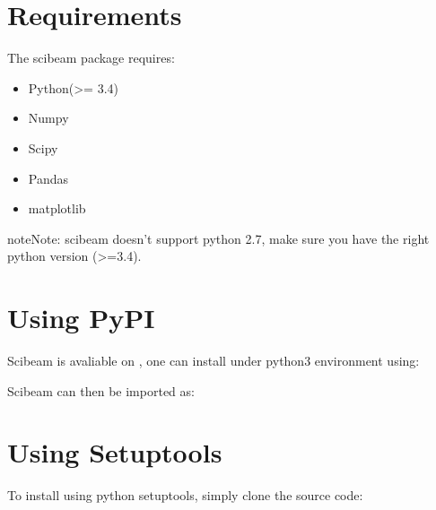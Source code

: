 \documentclass[letterpaper,10pt,english]{sphinxmanual}
\begin{document}
\section{Requirements}
\label{\detokenize{install:requirements}}
The scibeam package requires:
\begin{itemize}
\item {} 
Python(\textgreater{}= 3.4)

\item {} 
Numpy

\item {} 
Scipy

\item {} 
Pandas

\item {} 
matplotlib

\end{itemize}

\begin{sphinxadmonition}{note}{Note:}
scibeam doesn’t support python 2.7, make sure you have the right python version (\textgreater{}=3.4).
\end{sphinxadmonition}


\section{Using PyPI}
\label{\detokenize{install:using-pypi}}
Scibeam is avaliable on , one can install under python3 environment using:

%
\begin{sphinxVerbatim}[commandchars=\\\{\}]
  
\end{sphinxVerbatim}

Scibeam can then be imported as:

%
\begin{sphinxVerbatim}[commandchars=\\\{\}]
 
\end{sphinxVerbatim}


\section{Using Setuptools}
\label{\detokenize{install:using-setuptools}}
To install using python setuptools, simply clone the source code:

%
\begin{sphinxVerbatim}[commandchars=\\\{\}]
  
\end{sphinxVerbatim}
\end{document}
